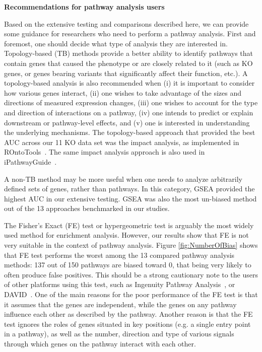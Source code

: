 \documentclass[Minh_PhD_thesis.tex]{subfiles}
\begin{document}
\textbf{Recommendations for pathway analysis users}

Based on the extensive testing and comparisons described here, we can provide some guidance for researchers who need to perform a pathway analysis. First and foremost, one should decide what type of analysis they are interested in. Topology-based (TB) methods  provide a better ability to identify pathways that contain genes that caused the phenotype or are closely related to it (such as KO genes, or genes bearing variants that significantly affect their function, etc.). A topology-based analysis is also recommended when (i) it is important to consider how various genes interact, (ii) one wishes to take advantage of the sizes and directions of measured expression changes, (iii) one wishes to account for the type and direction of interactions on a pathway, (iv) one intends to predict or explain downstream or pathway-level effects, and (v) one is interested in understanding the underlying mechanisms. The topology-based approach that  provided the best AUC across our 11 KO data set was the impact analysis, as implemented in ROntoTools~\cite{ROntoTools1.2.0}. The same impact analysis approach is also used in  iPathwayGuide~\cite{ahsan2017identifying,Pathway-GuideSoftware}.

A non-TB method may be more useful when one needs to analyze arbitrarily defined sets of genes, rather than pathways. In this category, GSEA provided the highest AUC in our extensive testing. GSEA was also the most un-biased method out of the 13 approaches benchmarked in our studies. 

The Fisher's Exact (FE) test or hypergeometric test is arguably the most widely  used method for enrichment analysis. However,  our results show that FE is not very suitable in the context of pathway analysis. Figure \ref{fig:NumberOfBias} shows that FE test performs the worst among the 13 compared pathway analysis methods:  137 out of 150 pathways are biased toward 0, that being very likely to often produce false positives. This  should be a strong cautionary note to the users of other platforms using this test, such as Ingenuity Pathway Analysis~\cite{kramer2013causal}, or DAVID~\cite{huang2008systematic}.
One of the main reasons for the poor performance of the FE test is that it assumes that the genes are independent, while the genes on any pathway influence each other as described by the pathway. Another reason is that the FE test ignores the roles of genes situated in key positions (e.g. a single entry point in a pathway), as well as the number, direction and type of various signals through which genes on the pathway interact with each other.
\end{document}
